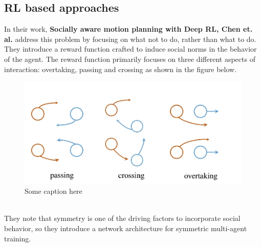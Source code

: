\subsection*{RL based approaches}
 In their work, \textbf{Socially aware motion planning with Deep RL, Chen et. al.}\cite{chen_socially_2017} address this problem by focusing on what not to do, rather than what to do. They introduce a reward function crafted to induce social norms in the behavior of the agent. The reward function primarily focuses on three different aspects of interaction: overtaking, passing and crossing as shown in the figure below.
 \begin{figure}[!htbp]
     \centering
    \includegraphics[width=.6\linewidth]{figures/chapter2_rl_based_approach}
    \caption{Some caption here}
    \label{fig:label1}
 \end{figure}
\\
They note that symmetry is one of the driving factors to incorporate social behavior, so they introduce a network architecture for symmetric multi-agent training.\\

